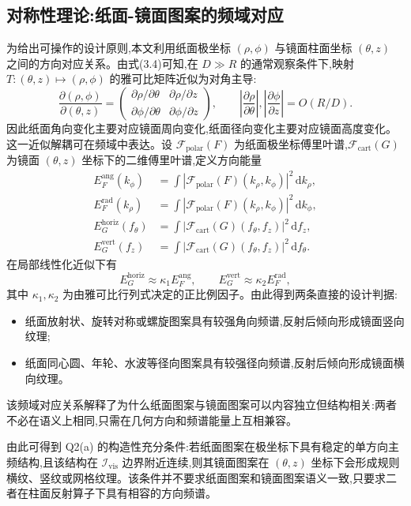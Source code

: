 \documentclass[12pt, a4paper]{ctexart}
\begin{document}
\subsection{对称性理论:纸面-镜面图案的频域对应}
为给出可操作的设计原则,本文利用纸面极坐标 $(\rho,\phi)$ 与镜面柱面坐标 $(\theta,z)$ 之间的方向对应关系。由式(3.4)可知,在 $D\gg R$ 的通常观察条件下,映射 $T:(\theta,z)\mapsto(\rho,\phi)$ 的雅可比矩阵近似为对角主导:
\[
\frac{\partial(\rho,\phi)}{\partial(\theta,z)}
=
\begin{pmatrix}
\partial \rho/\partial\theta & \partial\rho/\partial z\\
\partial \phi/\partial\theta & \partial\phi/\partial z
\end{pmatrix},
\qquad
\left|\frac{\partial\rho}{\partial\theta}\right|,
\left|\frac{\partial\phi}{\partial z}\right|
=O(R/D).
\]
因此纸面角向变化主要对应镜面周向变化,纸面径向变化主要对应镜面高度变化。这一近似解耦可在频域中表达。设 $\mathcal F_{\mathrm{polar}}(F)$ 为纸面极坐标傅里叶谱,$\mathcal F_{\mathrm{cart}}(G)$ 为镜面 $(\theta,z)$ 坐标下的二维傅里叶谱,定义方向能量
\[
\begin{aligned}
E_F^{\mathrm{ang}}(k_\phi)&=\int |\mathcal F_{\mathrm{polar}}(F)(k_\rho,k_\phi)|^2\,\mathrm dk_\rho,\\
E_F^{\mathrm{rad}}(k_\rho)&=\int |\mathcal F_{\mathrm{polar}}(F)(k_\rho,k_\phi)|^2\,\mathrm dk_\phi,\\
E_G^{\mathrm{horiz}}(f_\theta)&=\int |\mathcal F_{\mathrm{cart}}(G)(f_\theta,f_z)|^2\,\mathrm df_z,\\
E_G^{\mathrm{vert}}(f_z)&=\int |\mathcal F_{\mathrm{cart}}(G)(f_\theta,f_z)|^2\,\mathrm df_\theta .
\end{aligned}
\]
在局部线性化近似下有
\[
E_G^{\mathrm{horiz}}\approx \kappa_1 E_F^{\mathrm{ang}},\qquad
E_G^{\mathrm{vert}}\approx \kappa_2 E_F^{\mathrm{rad}},
\]
其中 $\kappa_1,\kappa_2$ 为由雅可比行列式决定的正比例因子。由此得到两条直接的设计判据:
\begin{itemize}
    \item 纸面放射状、旋转对称或螺旋图案具有较强角向频谱,反射后倾向形成镜面竖向纹理;
    \item 纸面同心圆、年轮、水波等径向图案具有较强径向频谱,反射后倾向形成镜面横向纹理。
\end{itemize}
该频域对应关系解释了为什么纸面图案与镜面图案可以内容独立但结构相关:两者不必在语义上相同,只需在几何方向和频谱能量上互相兼容。

由此可得到 Q2(a) 的构造性充分条件:若纸面图案在极坐标下具有稳定的单方向主频结构,且该结构在 $\mathcal I_{\mathrm{vis}}$ 边界附近连续,则其镜面图案在 $(\theta,z)$ 坐标下会形成规则横纹、竖纹或网格纹理。该条件并不要求纸面图案和镜面图案语义一致,只要求二者在柱面反射算子下具有相容的方向频谱。
\end{document}
